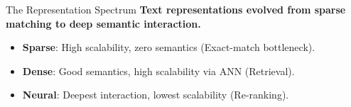 \documentclass[aspectratio=169]{beamer}
\newif\ifanimated
\newcommand{\cpause}{\ifanimated\pause\fi}
\begin{document}
\begin{frame}{The Representation Spectrum}
\textbf{Text representations evolved from sparse matching to deep semantic interaction.}

\vspace{0.8em}
\begin{itemize}
    \item \textbf{Sparse}: High scalability, zero semantics (Exact-match bottleneck).
    \item \textbf{Dense}: Good semantics, high scalability via ANN (Retrieval).
    \item \textbf{Neural}: Deepest interaction, lowest scalability (Re-ranking).
\end{itemize}\cpause

\vspace{0.5em}
\begin{center}

\end{center}
\end{frame}
\end{document}
